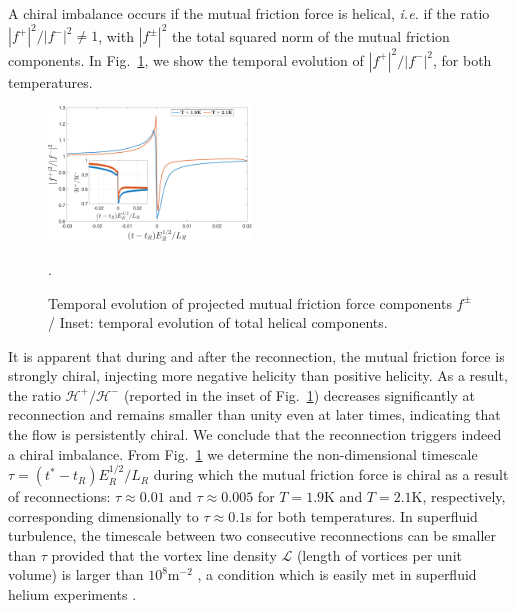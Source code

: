 \documentclass[%
 reprint,
 amsmath,amssymb,
 aps,
 prl,
]{revtex4-2}
\begin{document}
{A chiral imbalance occurs if the mutual friction force is helical, 
\textit{i.e.} if the ratio $|f^+|^2/|f^-|^2 \neq 1$, with $|f^\pm|^2$ the total squared norm of the mutual friction components. 
In Fig.~\ref{fig:mutual-friction-decomp}, we show the temporal evolution of $|f^+|^2/|f^-|^2$, for both temperatures. 
%
\begin{figure}[h!]
    \centering
    \includegraphics*[width=0.48\textwidth]{fmfDecompFig.pdf}
    \caption{Temporal evolution of projected mutual friction force components $f^\pm$/ Inset: temporal evolution of total helical components.}.
    \label{fig:mutual-friction-decomp}
\end{figure}
%
It is apparent
that during and after the reconnection, the mutual friction force is strongly chiral,
injecting more negative helicity than positive helicity. 
As a result, the ratio $\mathcal{H}^+/\mathcal{H}^-$ 
(reported in the inset of Fig.~\ref{fig:mutual-friction-decomp}) 
decreases significantly at reconnection and remains smaller than unity even at later times, 
indicating that the flow is persistently chiral. We conclude that the reconnection triggers indeed a chiral imbalance.
From Fig.~\ref{fig:mutual-friction-decomp} we determine the non-dimensional timescale $\tau = (t^*-t_R)E_R^{1/2}/L_R$
during which the mutual friction force is chiral as a result of reconnections: $\tau \approx 0.01$ and $\tau \approx 0.005$
for $T=1.9$K and $T=2.1$K, respectively, corresponding dimensionally to $\tau \approx 0.1$s for both temperatures. 
In superfluid turbulence, the timescale between two consecutive reconnections can be smaller than $\tau$ provided that the
vortex line density $\mathcal{L}$ (length of vortices per unit volume) is larger than $10^8 \text{m}^{-2}$ \cite{stasiak2024quantum,barenghi2004},
a condition which is easily met in superfluid helium experiments \cite{roche2007,Babuin2014}.




}
\end{document}
